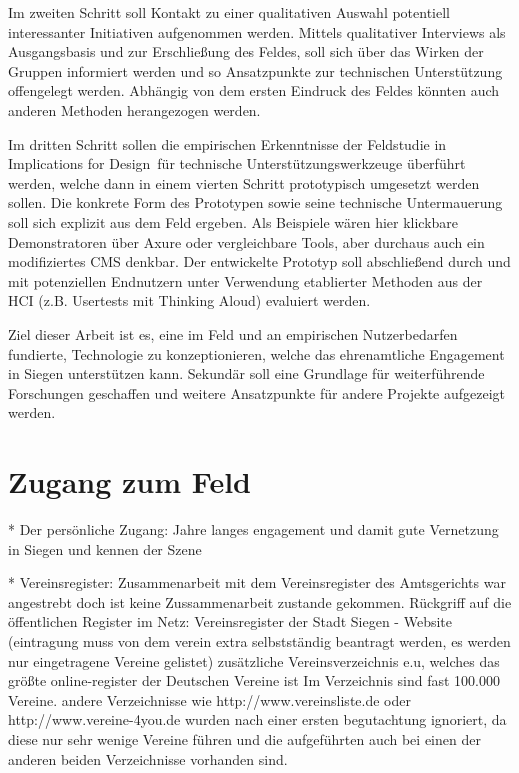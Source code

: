 Im zweiten Schritt soll Kontakt zu einer qualitativen Auswahl potentiell interessanter Initiativen aufgenommen werden. Mittels qualitativer Interviews als Ausgangsbasis und zur Erschließung des Feldes, soll sich über das Wirken der Gruppen informiert werden und so Ansatzpunkte zur technischen Unterstützung offengelegt werden. Abhängig von dem ersten Eindruck des Feldes könnten auch anderen Methoden herangezogen werden. 

Im dritten Schritt sollen die empirischen Erkenntnisse der Feldstudie in \glqq Implications for Design\grqq ~für technische Unterstützungswerkzeuge überführt werden, welche dann in einem vierten Schritt prototypisch umgesetzt werden sollen. Die konkrete Form des Prototypen sowie seine technische Untermauerung soll sich explizit aus dem Feld ergeben. Als Beispiele wären hier klickbare Demonstratoren über Axure oder vergleichbare Tools, aber durchaus auch ein modifiziertes CMS denkbar. Der entwickelte Prototyp soll abschließend durch und mit potenziellen Endnutzern unter Verwendung etablierter Methoden aus der HCI (z.B. Usertests mit \glqq Thinking Aloud\grqq ) evaluiert werden.

Ziel dieser Arbeit ist es, eine im Feld und an empirischen Nutzerbedarfen fundierte, Technologie zu konzeptionieren, welche das ehrenamtliche Engagement in Siegen unterstützen kann. Sekundär soll eine Grundlage für weiterführende Forschungen geschaffen und weitere Ansatzpunkte für andere Projekte aufgezeigt werden. 

\section{Zugang zum Feld}

* Der persönliche Zugang:
Jahre langes engagement und damit gute Vernetzung in Siegen und kennen der Szene

* Vereinsregister:
Zusammenarbeit mit dem Vereinsregister des Amtsgerichts war angestrebt doch ist keine Zussammenarbeit zustande gekommen. Rückgriff auf die öffentlichen Register im Netz: Vereinsregister der Stadt Siegen - Website (eintragung muss von dem verein extra selbstständig beantragt werden, es werden nur eingetragene Vereine gelistet)
zusätzliche Vereinsverzeichnis e.u, welches das größte online-register der Deutschen Vereine ist Im Verzeichnis sind fast 100.000 Vereine. andere Verzeichnisse wie http://www.vereinsliste.de oder http://www.vereine-4you.de wurden nach einer ersten begutachtung ignoriert, da diese nur sehr wenige Vereine führen und die aufgeführten auch bei einen der anderen beiden Verzeichnisse vorhanden sind. 

